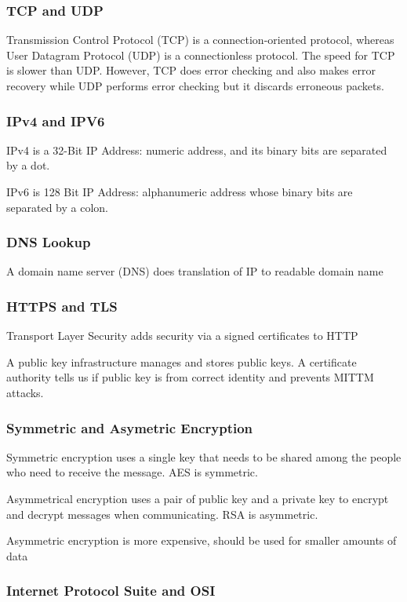\documentclass{article}
\begin{document}
    \subsubsection{TCP and UDP}
    Transmission Control Protocol (TCP) is a connection-oriented protocol, whereas User Datagram Protocol (UDP) is a connectionless protocol. The speed for TCP is slower than UDP. However, TCP does error checking and also makes error recovery  while UDP performs error checking but it discards erroneous packets.
    
    \subsubsection{IPv4 and IPV6}
    IPv4 is a 32-Bit IP Address: numeric address, and its binary bits are separated by a dot.
    
    IPv6 is 128 Bit IP Address: alphanumeric address whose binary bits are separated by a colon.

    \subsubsection{DNS Lookup}
    A domain name server (DNS) does translation of IP to readable domain name
    
    \subsubsection{HTTPS and TLS}
    Transport Layer Security adds security via a signed certificates to HTTP
    
    A public key infrastructure manages and stores public keys. A certificate authority tells us if public key is from correct identity and prevents MITTM attacks.

    \subsubsection{Symmetric and Asymetric Encryption}
    Symmetric encryption uses a single key that needs to be shared among the people who need to receive the message. AES is symmetric.
    
    Asymmetrical encryption uses a pair of public key and a private key to encrypt and decrypt messages when communicating. RSA is asymmetric.
    
    Asymmetric encryption is more expensive, should be used for smaller amounts of data
    
    \subsubsection{Internet Protocol Suite and OSI}
    
\end{document}

